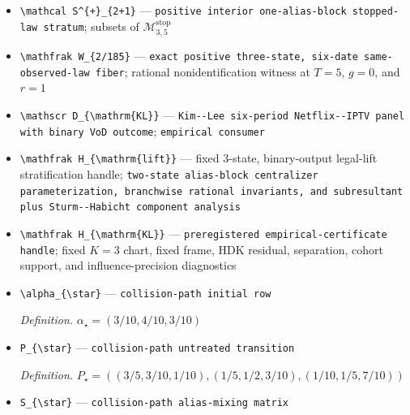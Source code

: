 \documentclass{article}
\begin{document}
\begin{itemize}
  \item \texttt{\textbackslash{}\allowbreak{}mathcal S\textasciicircum{}\{+\allowbreak{}\}\allowbreak{}\_\allowbreak{}\{2+\allowbreak{}1\}\allowbreak{}} --- \texttt{positive interior one-\allowbreak{}alias-\allowbreak{}block stopped-\allowbreak{}law stratum}; subsets of \(\mathcal M^{\mathrm{stop}}_{3,5}\)
  \item \texttt{\textbackslash{}\allowbreak{}mathfrak W\_\allowbreak{}\{2/\allowbreak{}185\}\allowbreak{}} --- \texttt{exact positive three-\allowbreak{}state,\allowbreak{} six-\allowbreak{}date same-\allowbreak{}observed-\allowbreak{}law fiber}; rational nonidentification witness at \(T=5\), \(g=0\), and \(r=1\)
  \item \texttt{\textbackslash{}\allowbreak{}mathscr D\_\allowbreak{}\{\textbackslash{}\allowbreak{}mathrm\{KL\}\allowbreak{}\}\allowbreak{}} --- \texttt{Kim-\allowbreak{}-\allowbreak{}Lee six-\allowbreak{}period Netflix-\allowbreak{}-\allowbreak{}IPTV panel with binary VoD outcome}; \texttt{empirical consumer}
  \item \texttt{\textbackslash{}\allowbreak{}mathfrak H\_\allowbreak{}\{\textbackslash{}\allowbreak{}mathrm\{lift\}\allowbreak{}\}\allowbreak{}} --- fixed \(3\)-state, binary-output legal-lift stratification handle; \texttt{two-\allowbreak{}state alias-\allowbreak{}block centralizer parameterization,\allowbreak{} branchwise rational invariants,\allowbreak{} and subresultant plus Sturm-\allowbreak{}-\allowbreak{}Habicht component analysis}
  \item \texttt{\textbackslash{}\allowbreak{}mathfrak H\_\allowbreak{}\{\textbackslash{}\allowbreak{}mathrm\{KL\}\allowbreak{}\}\allowbreak{}} --- \texttt{preregistered empirical-\allowbreak{}certificate handle}; fixed \(K=3\) chart, fixed frame, HDK residual, separation, cohort support, and influence-precision diagnostics
  \item \texttt{\textbackslash{}\allowbreak{}alpha\_\allowbreak{}\{\textbackslash{}\allowbreak{}star\}\allowbreak{}} --- \texttt{collision-\allowbreak{}path initial row}
  \par\smallskip\noindent\emph{Definition.} \(\alpha_{\star}=(3/10,4/10,3/10)\)
  \item \texttt{P\_\allowbreak{}\{\textbackslash{}\allowbreak{}star\}\allowbreak{}} --- \texttt{collision-\allowbreak{}path untreated transition}
  \par\smallskip\noindent\emph{Definition.} \(P_{\star}=((3/5,3/10,1/10),(1/5,1/2,3/10),(1/10,1/5,7/10))\)
  \item \texttt{S\_\allowbreak{}\{\textbackslash{}\allowbreak{}star\}\allowbreak{}} --- \texttt{collision-\allowbreak{}path alias-\allowbreak{}mixing matrix}

\end{itemize}
\end{document}
